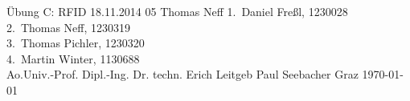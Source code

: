 \TUHeader                          %
{Übung C: RFID}                       %
{18.11.2014}                        %
{05}                            %
{Thomas Neff}                   %
{
1.~Daniel Freßl, 1230028\\
2.~Thomas Neff, 1230319\\                    %
3.~Thomas Pichler, 1230320 \\                   %
4.~Martin Winter, 1130688\\
}
{Ao.Univ.-Prof. Dipl.-Ing. Dr. techn. Erich Leitgeb}
{Paul Seebacher}                          %
{Graz}                              %
{\today}                            %




\pagebreak
  
\tableofcontents
  
\pagebreak